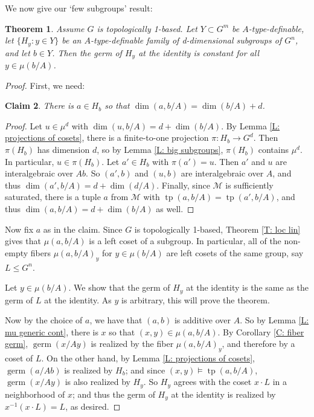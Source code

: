 \documentclass{amsart}
\newtheorem{theorem}{Theorem}[section]
\newtheorem{claim}[theorem]{Claim}
\theoremstyle{definition}
\newcommand{\tp}{\operatorname{tp}}
\begin{document}
We now give our `few subgroups' result:

\begin{theorem}\label{T: few subgroups}
    Assume $G$ is topologically 1-based. Let $Y\subset G^m$ be $A$-type-definable, let $\{H_y:y\in Y\}$ be an $A$-type-definable family of d-dimensional subgroups of $G^n$, and let $b\in Y$. Then the germ of $H_y$ at the identity is constant for all $y\in\mu(b/A)$.
\end{theorem}
\begin{proof}
    First, we need:
    \begin{claim} There is $a\in H_b$ so that $\dim(a,b/A)=\dim(b/A)+d$. 
    \end{claim}
    \begin{proof}
        Let $u\in\mu^d$ with $\dim(u,b/A)=d+\dim(b/A)$. By Lemma \ref{L: projections of cosets}, there is a finite-to-one projection $\pi:H_b\rightarrow G^d$. Then $\pi(H_b)$ has dimension $d$, so by Lemma \ref{L: big subgroups}, $\pi(H_b)$ contains $\mu^d$. In particular, $u\in\pi(H_b)$. Let $a'\in H_b$ with $\pi(a')=u$. Then $a'$ and $u$ are interalgebraic over $Ab$. So $(a',b)$ and $(u,b)$ are interalgebraic over $A$, and thus $\dim(a',b/A)=d+\dim(d/A)$. Finally, since $\mathcal M$ is sufficiently saturated, there is a tuple $a$ from $\mathcal M$ with $\tp(a,b/A)=\tp(a',b/A)$, and thus $\dim(a,b/A)=d+\dim(b/A)$ as well.
    \end{proof}
    Now fix $a$ as in the claim. Since $G$ is topologically 1-based, Theorem \ref{T: loc lin} gives that $\mu(a,b/A)$ is a left coset of a subgroup. In particular, all of the non-empty fibers $\mu(a,b/A)_y$ for $y\in\mu(b/A)$ are left cosets of the same group, say $L\leq G^n$.
    
    Let $y\in\mu(b/A)$. We show that the germ of $H_y$ at the identity is the same as the germ of $L$ at the identity. As $y$ is arbitrary, this will prove the theorem.
    
    Now by the choice of $a$, we have that $(a,b)$ is additive over $A$. So by Lemma \ref{L: mu generic cont}, there is $x$ so that $(x,y)\in\mu(a,b/A)$. By Corollary \ref{C: fiber germ}, $\operatorname{germ}(x/Ay)$ is realized by the fiber $\mu(a,b/A)_y$, and therefore by a coset of $L$. On the other hand, by Lemma \ref{L: projections of cosets}, $\operatorname{germ}(a/Ab)$ is realized by $H_b$; and since $(x,y)\models\tp(a,b/A)$, $\operatorname{germ}(x/Ay)$ is also realized by $H_y$. So $H_y$ agrees with the coset $x\cdot L$ in a neighborhood of $x$; and thus the germ of $H_y$ at the identity is realized by $x^{-1}(x\cdot L)=L$, as desired.
\end{proof}
\end{document}
